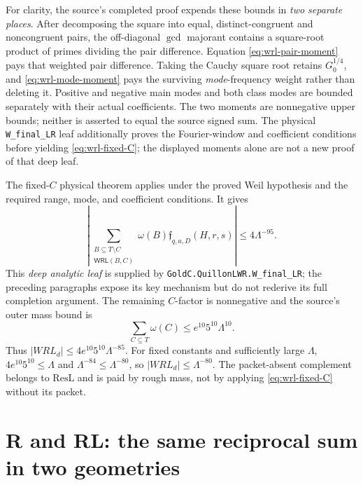 \documentclass[11pt]{article}
\newcommand{\Lam}{\Lambda}
\newcommand{\omegaR}{\omega}
\newcommand{\F}{\mathfrak f}
\theoremstyle{definition}
\theoremstyle{remark}
\newcommand{\1}{\mathbf 1}
\begin{document}
\noindent
For clarity, the source's completed proof expends these bounds in
\emph{two separate places}. After decomposing the square into equal,
distinct-congruent and noncongruent pairs, the off-diagonal
$\gcd$ majorant contains a square-root product of primes dividing
the pair difference. Equation \eqref{eq:wrl-pair-moment} pays that
weighted pair difference. Taking the Cauchy square root retains
$G_0^{1/4}$, and \eqref{eq:wrl-mode-moment} pays the surviving
\emph{mode}-frequency weight rather than deleting it.
Positive and negative main modes and both class modes are bounded
separately with their actual coefficients. The two moments are
nonnegative upper bounds; neither is asserted to equal the source
signed sum. The physical \texttt{W\_final\_LR} leaf additionally
proves the Fourier-window and coefficient conditions before yielding
\eqref{eq:wrl-fixed-C}; the displayed moments alone are not a
new proof of that deep leaf.

The fixed-$C$ physical theorem applies under the proved
Weil hypothesis and the required range, mode, and coefficient
conditions. It gives
\begin{equation}\label{eq:wrl-fixed-C}
 \left|\sum_{\substack{B\subseteq T\setminus C\\\mathsf{WRL}(B,C)}}
 \omegaR(B)\F_{q,a,D}(H,r,s)\right|
 \le4\Lam^{-95}.
\end{equation}
This \emph{deep analytic leaf} is supplied by
\texttt{GoldC.QuillonLWR.W\_final\_LR}; the preceding
paragraphs expose its key mechanism but do not rederive
its full completion argument.
The remaining $C$-factor is nonnegative and the source's
outer mass bound is
\begin{equation}\label{eq:outer-mass}
 \sum_{C\subseteq T}\omegaR(C)
 \le e^{10}5^{10}\Lam^{10}.
\end{equation}
Thus $|WRL_d|\le4e^{10}5^{10}\Lam^{-85}$.
For fixed constants and sufficiently large $\Lam$,
$4e^{10}5^{10}\le\Lam$ and $\Lam^{-84}\le\Lam^{-80}$,
so $|WRL_d|\le\Lam^{-80}$. The packet-absent complement
belongs to $\mathrm{ResL}$ and is paid by rough mass, not
by applying \eqref{eq:wrl-fixed-C} without its packet.

\section{R and RL: the same reciprocal sum in two geometries}
\label{sec:reciprocal}
\end{document}
